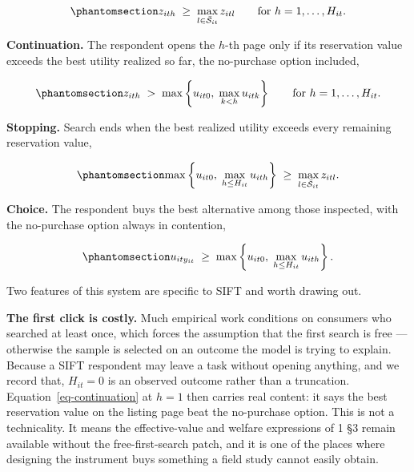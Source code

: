 \documentclass[
  letterpaper,
  DIV=11,
  numbers=noendperiod]{scrartcl}
\begin{document}
\begin{equation}\protect\phantomsection\label{eq-selection}{
\resv_{ith} \;\ge\; \max_{l \in \Sbar_{it}} \resv_{itl}
\qquad \text{for } h = 1,\dots,H_{it}.
}\end{equation}

\textbf{Continuation.} The respondent opens the \(h\)-th page only if
its reservation value exceeds the best utility realized so far, the
no-purchase option included,

\begin{equation}\protect\phantomsection\label{eq-continuation}{
\resv_{ith} \;>\; \max\left\{u_{it0},\; \max_{k<h} u_{itk}\right\}
\qquad \text{for } h = 1,\dots,H_{it}.
}\end{equation}

\textbf{Stopping.} Search ends when the best realized utility exceeds
every remaining reservation value,

\begin{equation}\protect\phantomsection\label{eq-stopping}{
\max\left\{u_{it0},\; \max_{h \le H_{it}} u_{ith}\right\} \;\ge\; \max_{l \in \Sbar_{it}} \resv_{itl}.
}\end{equation}

\textbf{Choice.} The respondent buys the best alternative among those
inspected, with the no-purchase option always in contention,

\begin{equation}\protect\phantomsection\label{eq-choice}{
u_{it y_{it}} \;\ge\; \max\left\{u_{it0},\; \max_{h \le H_{it}} u_{ith}\right\}.
}\end{equation}

Two features of this system are specific to SIFT and worth drawing out.

\textbf{The first click is costly.} Much empirical work conditions on
consumers who searched at least once, which forces the assumption that
the first search is free --- otherwise the sample is selected on an
outcome the model is trying to explain. Because a SIFT respondent may
leave a task without opening anything, and we record that,
\(H_{it} = 0\) is an observed outcome rather than a truncation.
Equation~\ref{eq-continuation} at \(h=1\) then carries real content: it
says the best reservation value on the listing page beat the no-purchase
option. This is not a technicality. It means the effective-value and
welfare expressions of 1 §3 remain available without the
free-first-search patch, and it is one of the places where designing the
instrument buys something a field study cannot easily obtain.
\end{document}
